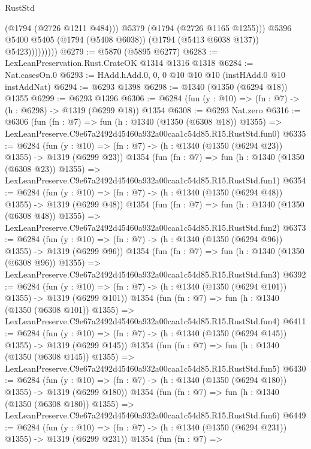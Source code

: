 \begin{lexlean}{RustStd}
\begin{coremodule}
                          (@1794 (@2726 @1211 @484)))
                        @5379
                        (@1794 (@2726 @1165 @1255)))
                      @5396
                      @5400
                      @5405
                      (@1794 (@5408 @6038))
                      (@1794 (@5413 @6038 @137))
                      @5423)))))))))
@6279 := @5870 (@5895 @6277)
@6283 := LexLeanPreservation.Rust.CrateOK @1314 @1316 @1318
@6284 := Nat.casesOn.{0}
@6293 := HAdd.hAdd.{0, 0, 0} @10 @10 @10 (instHAdd.{0} @10 instAddNat)
@6294 := @6293 @1398
@6298 := @1340 (@1350 (@6294 @18)) @1355
@6299 := @6293 @1396
@6306 := @6284 (fun (y : @10) => (fn : @7) -> (h : @6298) -> @1319 (@6299 @18)) @1354
@6308 := @6293 Nat.zero
@6316 := @6306
    (fun (fn : @7) =>
    fun (h : @1340 (@1350 (@6308 @18)) @1355) =>
    LexLeanPreserve.C9e67a2492d45460a932a00caa1c54d85.R15.RustStd.fun0)
@6335 := @6284
    (fun (y : @10) => (fn : @7) -> (h : @1340 (@1350 (@6294 @23)) @1355) -> @1319 (@6299 @23))
    @1354
    (fun (fn : @7) =>
    fun (h : @1340 (@1350 (@6308 @23)) @1355) =>
    LexLeanPreserve.C9e67a2492d45460a932a00caa1c54d85.R15.RustStd.fun1)
@6354 := @6284
    (fun (y : @10) => (fn : @7) -> (h : @1340 (@1350 (@6294 @48)) @1355) -> @1319 (@6299 @48))
    @1354
    (fun (fn : @7) =>
    fun (h : @1340 (@1350 (@6308 @48)) @1355) =>
    LexLeanPreserve.C9e67a2492d45460a932a00caa1c54d85.R15.RustStd.fun2)
@6373 := @6284
    (fun (y : @10) => (fn : @7) -> (h : @1340 (@1350 (@6294 @96)) @1355) -> @1319 (@6299 @96))
    @1354
    (fun (fn : @7) =>
    fun (h : @1340 (@1350 (@6308 @96)) @1355) =>
    LexLeanPreserve.C9e67a2492d45460a932a00caa1c54d85.R15.RustStd.fun3)
@6392 := @6284
    (fun (y : @10) => (fn : @7) -> (h : @1340 (@1350 (@6294 @101)) @1355) -> @1319 (@6299 @101))
    @1354
    (fun (fn : @7) =>
    fun (h : @1340 (@1350 (@6308 @101)) @1355) =>
    LexLeanPreserve.C9e67a2492d45460a932a00caa1c54d85.R15.RustStd.fun4)
@6411 := @6284
    (fun (y : @10) => (fn : @7) -> (h : @1340 (@1350 (@6294 @145)) @1355) -> @1319 (@6299 @145))
    @1354
    (fun (fn : @7) =>
    fun (h : @1340 (@1350 (@6308 @145)) @1355) =>
    LexLeanPreserve.C9e67a2492d45460a932a00caa1c54d85.R15.RustStd.fun5)
@6430 := @6284
    (fun (y : @10) => (fn : @7) -> (h : @1340 (@1350 (@6294 @180)) @1355) -> @1319 (@6299 @180))
    @1354
    (fun (fn : @7) =>
    fun (h : @1340 (@1350 (@6308 @180)) @1355) =>
    LexLeanPreserve.C9e67a2492d45460a932a00caa1c54d85.R15.RustStd.fun6)
@6449 := @6284
    (fun (y : @10) => (fn : @7) -> (h : @1340 (@1350 (@6294 @231)) @1355) -> @1319 (@6299 @231))
    @1354
    (fun (fn : @7) =>

\end{coremodule}
\end{lexlean}
